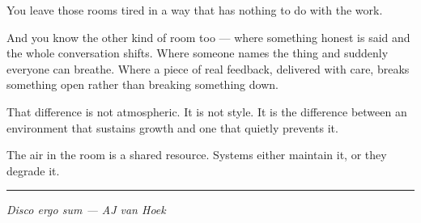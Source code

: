 \documentclass[12pt,letterpaper]{article}
\begin{document}
You leave those rooms tired in a way that has nothing to do with the work.

And you know the other kind of room too — where something honest is said and the whole conversation shifts. Where someone names the thing and suddenly everyone can breathe. Where a piece of real feedback, delivered with care, breaks something open rather than breaking something down.

That difference is not atmospheric. It is not style. It is the difference between an environment that sustains growth and one that quietly prevents it.

The air in the room is a shared resource. Systems either maintain it, or they degrade it.

\begin{center}
\rule{\textwidth}{0.4pt}
\end{center}

\begin{flushright}
\textit{Disco ergo sum — AJ van Hoek}
\end{flushright}
\end{document}
